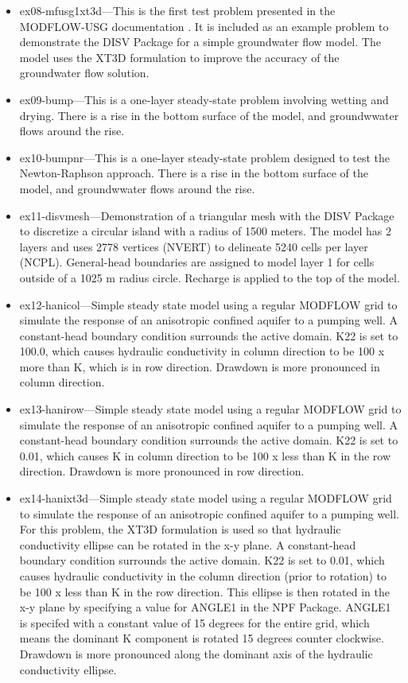 \begin{itemize}
\item ex08-mfusg1xt3d---This is the first test problem presented in the MODFLOW-USG documentation \citep{modflowusg}.  It is included as an example problem to demonstrate the DISV Package for a simple groundwater flow model.  The model uses the XT3D formulation to improve the accuracy of the groundwater flow solution.

\item ex09-bump---This is a one-layer steady-state problem involving wetting and drying.  There is a rise in the bottom surface of the model, and groundwwater flows around the rise.

\item ex10-bumpnr---This is a one-layer steady-state problem designed to test the Newton-Raphson approach.  There is a rise in the bottom surface of the model, and groundwwater flows around the rise.

\item ex11-disvmesh---Demonstration of a triangular mesh with the DISV Package to discretize a circular island with a radius of 1500 meters.  The model has 2 layers and uses 2778 vertices (NVERT) to delineate 5240 cells per layer (NCPL).  General-head boundaries are assigned to model layer 1 for cells outside of a 1025 m radius circle.  Recharge is applied to the top of the model. 

\item ex12-hanicol---Simple steady state model using a regular MODFLOW grid to simulate the response of an anisotropic confined aquifer to a pumping well. A constant-head boundary condition surrounds the active domain.  K22 is set to 100.0, which causes hydraulic conductivity in column direction to be 100 x more than K, which is in row direction.  Drawdown is more pronounced in column direction.

\item ex13-hanirow---Simple steady state model using a regular MODFLOW grid to simulate the response of an anisotropic confined aquifer to a pumping well. A constant-head boundary condition surrounds the active domain.  K22 is set to 0.01, which causes K in column direction to be 100 x less than K in the row direction.  Drawdown is more pronounced in row direction.

\item ex14-hanixt3d---Simple steady state model using a regular MODFLOW grid to simulate the response of an anisotropic confined aquifer to a pumping well. For this problem, the XT3D formulation is used so that hydraulic conductivity ellipse can be rotated in the x-y plane.  A constant-head boundary condition surrounds the active domain.  K22 is set to 0.01, which causes hydraulic conductivity in the column direction (prior to rotation) to be 100 x less than K in the row direction.  This ellipse is then rotated in the x-y plane by specifying a value for ANGLE1 in the NPF Package.  ANGLE1 is specifed with a constant value of 15 degrees for the entire grid, which means the dominant K component is rotated 15 degrees counter clockwise.  Drawdown is more pronounced along the dominant axis of the hydraulic conductivity ellipse.


\end{itemize}
